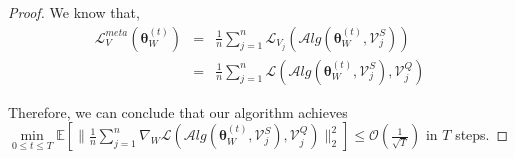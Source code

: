 \begin{proof}
We know that,
\begin{eqnarray}
    \mathcal{L}_{V}^{meta}(\boldsymbol{\theta}^{(t)}_{W}) &=& \frac{1}{n}\sum_{j=1}^{n}\mathcal{L}_{V_j}(\mathcal{A}lg(\boldsymbol{\theta}^{(t)}_{W},\mathcal{V}_j^{S}))\\
    &=& \frac{1}{n}\sum_{j=1}^{n}\mathcal{L}(\mathcal{A}lg(\boldsymbol{\theta}^{(t)}_{W},\mathcal{V}_j^{S}), \mathcal{V}_j^{Q})
\end{eqnarray}

Therefore, we can conclude that our algorithm achieves $\underset{0\le t \le T}{\min} \mathbb{E}[\| \frac{1}{n}\sum_{j=1}^{n}\nabla_W \mathcal{L}(\mathcal{A}lg(\boldsymbol{\theta}^{(t)}_{W},\mathcal{V}_j^{S}), \mathcal{V}_j^{Q})  \|^2_2] \le \mathcal{O}(\frac{1}{\sqrt{T}}) $ in $T$ steps.
\end{proof}

